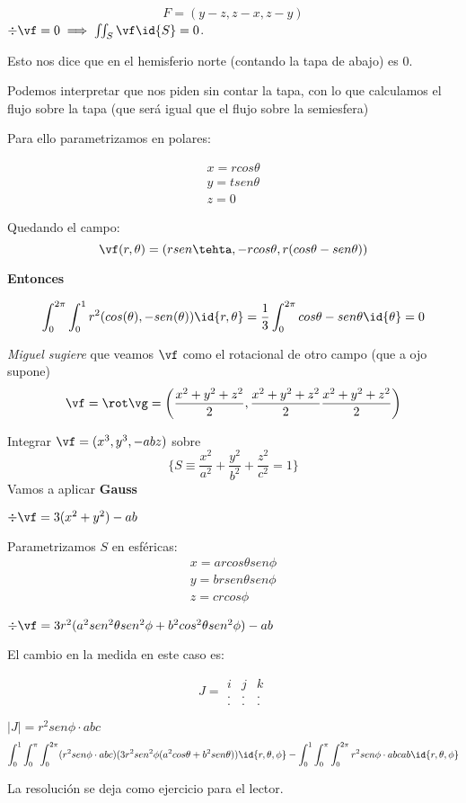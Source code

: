 \begin{problem}[25]
\[F=(y-z,z-x,z-y)\]
\solution
$\div \vf = 0 \implies \iint_S \vf \id{S}=0$.

Esto nos dice que en el hemisferio norte (contando la tapa de abajo) es 0.

Podemos interpretar que nos piden sin contar la tapa, con lo que calculamos el flujo sobre la tapa (que será igual que el flujo sobre la semiesfera)

Para ello parametrizamos en polares:

\begin{gather*}
x=rcos\theta\\
y=tsen\theta\\
z=0
\end{gather*}

Quedando el campo:
\[\vf(r,\theta) = (rsen\tehta,-rcos\theta,r(cos\theta-sen\theta))\]

\textbf{Entonces}

\[\int_0^{2\pi}\int_0^1 r^2(cos(\theta),-sen(\theta))\id{r,\theta} = \frac{1}{3} \int_0^{2\pi} cos\theta - sen\theta \id{\theta} = 0\]

\textit{Miguel sugiere} que veamos $\vf$ como el rotacional de otro campo (que a ojo supone)
\[\vf=\rot\vg = \left(\frac{x^2+y^2+z^2}{2},\frac{x^2+y^2+z^2}{2}\frac{x^2+y^2+z^2}{2}\right)\]
\end{problem}

\begin{problem}[26]
Integrar $\vf = (x^3,y^3,-abz)$ sobre \[\{S \equiv \frac{x^2}{a^2} + \frac{y^2}{b^2} + \frac{z^2}{c^2} = 1\}\]
\solution
Vamos a aplicar \textbf{Gauss}

$\div\vf = 3(x^2+y^2)-ab$

Parametrizamos $S$ en esféricas:
\begin{gather*}
x=arcos\theta sen\phi\\
y=brsen\theta sen\phi\\
z=crcos\phi
\end{gather*}

$\div\vf = 3r^2(a^2 sen^2\theta sen^2\phi + b^2cos^2\theta sen^2\phi)-ab$

El cambio en la medida en este caso es:

\[J = \begin{matrix}
i&j&k\\
.&.&.\\
.&.&.
\end{matrix}\]

$|J| = r^2sen\phi\cdot abc$
\[\int_0^1\int_0^{\pi}\int_0^{2\pi} (r^2sen\phi\cdot abc) (3r^2sen^2\phi(a^2cos\theta + b^2sen\theta))\id{r,\theta,\phi} - \int_0^1\int_0^{\pi}\int_0^{2\pi} r^2sen\phi\cdot abcab \id{r,\theta,\phi}\]

La resolución se deja como ejercicio para el lector.
\end{problem}

